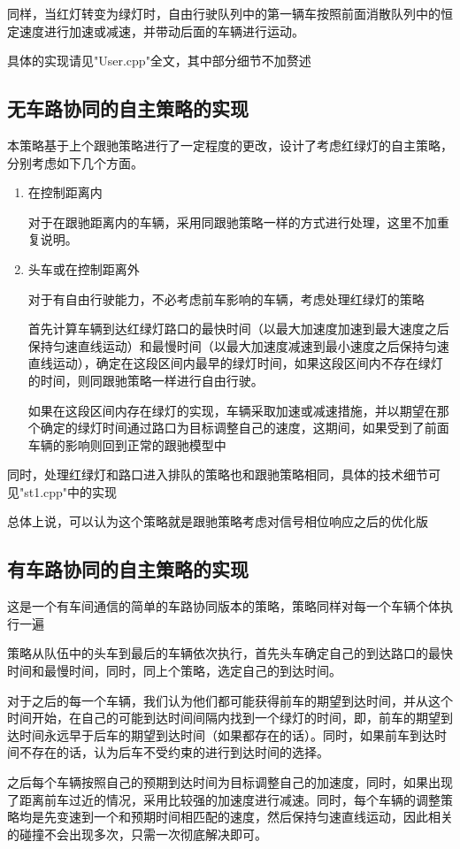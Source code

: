 \documentclass[UTF8,a4paper]{ctexart}
\begin{document}
同样，当红灯转变为绿灯时，自由行驶队列中的第一辆车按照前面消散队列中的恒定速度进行加速或减速，并带动后面的车辆进行运动。

具体的实现请见"User.cpp"全文，其中部分细节不加赘述
\subsection{无车路协同的自主策略的实现}
本策略基于上个跟驰策略进行了一定程度的更改，设计了考虑红绿灯的自主策略，分别考虑如下几个方面。

\begin{enumerate}
\item 在控制距离内

对于在跟驰距离内的车辆，采用同跟驰策略一样的方式进行处理，这里不加重复说明。
\item 头车或在控制距离外

对于有自由行驶能力，不必考虑前车影响的车辆，考虑处理红绿灯的策略

首先计算车辆到达红绿灯路口的最快时间（以最大加速度加速到最大速度之后保持匀速直线运动）和最慢时间（以最大加速度减速到最小速度之后保持匀速直线运动），确定在这段区间内最早的绿灯时间，如果这段区间内不存在绿灯的时间，则同跟驰策略一样进行自由行驶。

如果在这段区间内存在绿灯的实现，车辆采取加速或减速措施，并以期望在那个确定的绿灯时间通过路口为目标调整自己的速度，这期间，如果受到了前面车辆的影响则回到正常的跟驰模型中
\end{enumerate}
同时，处理红绿灯和路口进入排队的策略也和跟驰策略相同，具体的技术细节可见"st1.cpp"中的实现

总体上说，可以认为这个策略就是跟驰策略考虑对信号相位响应之后的优化版
\subsection{有车路协同的自主策略的实现}
这是一个有车间通信的简单的车路协同版本的策略，策略同样对每一个车辆个体执行一遍

策略从队伍中的头车到最后的车辆依次执行，首先头车确定自己的到达路口的最快时间和最慢时间，同时，同上个策略，选定自己的到达时间。

对于之后的每一个车辆，我们认为他们都可能获得前车的期望到达时间，并从这个时间开始，在自己的可能到达时间间隔内找到一个绿灯的时间，即，前车的期望到达时间永远早于后车的期望到达时间（如果都存在的话）。同时，如果前车到达时间不存在的话，认为后车不受约束的进行到达时间的选择。

之后每个车辆按照自己的预期到达时间为目标调整自己的加速度，同时，如果出现了距离前车过近的情况，采用比较强的加速度进行减速。同时，每个车辆的调整策略均是先变速到一个和预期时间相匹配的速度，然后保持匀速直线运动，因此相关的碰撞不会出现多次，只需一次彻底解决即可。
\end{document}
